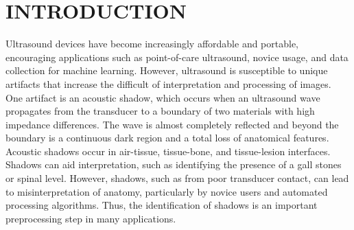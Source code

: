 \documentclass[preprint,5p]{elsarticle}
\begin{document}
\pagebreak

\linenumbers








\section*{INTRODUCTION}
\label{intro}
Ultrasound devices have become increasingly affordable and portable, encouraging applications such as point-of-care ultrasound, novice usage, and data collection for machine learning. However, ultrasound is susceptible to unique artifacts that increase the difficult of interpretation and processing of images. One artifact is an acoustic shadow, which occurs when an ultrasound wave propagates from the transducer to a boundary of two materials with high impedance differences. The wave is almost completely reflected and beyond the boundary is a continuous dark region and a total loss of anatomical features. Acoustic shadows occur in air-tissue, tissue-bone, and tissue-lesion interfaces. Shadows can aid interpretation, such as identifying the presence of a gall stones or spinal level. However, shadows, such as from poor transducer contact, can lead to misinterpretation of anatomy, particularly by novice users and automated processing algorithms. Thus, the identification of shadows is an important preprocessing step in many applications.
\end{document}
